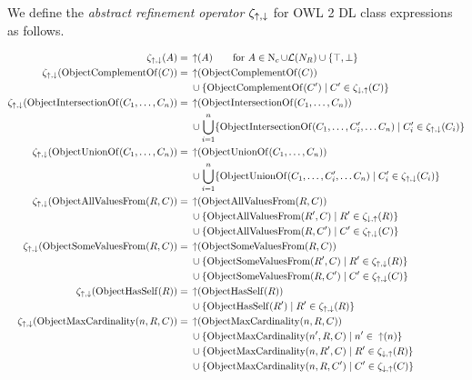 \begin{definition}
  We define the \emph{abstract refinement operator} $\zeta_{\operatorname{\uparrow},\operatorname{\downarrow}}$ for OWL 2 DL class expressions as follows.
  \begin{widepage}
    \scriptsize
    \begin{align*}
     \zeta_{\refine, \corefine}(A) ={} & \refine (A) \qquad \text{for } A \in \op{N}_c \cup \Lmc(N_R) \cup \{ \top , \bot \} \\
     \zeta_{\refine, \corefine}(\op{ObjectComplementOf}(C)) ={} & \refine (\op{ObjectComplementOf}(C)) \\& \cup \{ \op{ObjectComplementOf}(C') \mid C' \in \zeta_{\corefine, \refine} (C) \} \\
     \zeta_{\refine, \corefine}(\op{ObjectIntersectionOf}(C_1, \dots, C_n)) ={} & \refine (\op{ObjectIntersectionOf}(C_1, \dots, C_n)) \\& \cup \bigcup_{i=1}^n \{\op{ObjectIntersectionOf}(C_1, \dots, C_i', \dots C_n) \mid C_i' \in \zeta_{\refine, \corefine} (C_i) \} \\
     \zeta_{\refine, \corefine}(\op{ObjectUnionOf}(C_1, \dots, C_n)) ={} & \refine (\op{ObjectUnionOf}(C_1, \dots, C_n)) \\& \cup \bigcup_{i=1}^n \{ \op{ObjectUnionOf}(C_1, \dots, C_i', \dots C_n) \mid C_i' \in \zeta_{\refine, \corefine} (C_i)\} \\
     \zeta_{\refine, \corefine}(\op{ObjectAllValuesFrom}(R, C)) ={} & \refine (\op{ObjectAllValuesFrom}(R, C)) \\& \cup \{\op{ObjectAllValuesFrom}(R', C) \mid R' \in \zeta_{\corefine, \refine} (R)\} \\& \cup \{\op{ObjectAllValuesFrom}(R, C') \mid C' \in \zeta_{\refine, \corefine} (C)\} \\
     \zeta_{\refine, \corefine}(\op{ObjectSomeValuesFrom}(R, C)) ={} & \refine (\op{ObjectSomeValuesFrom}(R, C)) \\& \cup \{\op{ObjectSomeValuesFrom}(R', C) \mid R' \in \zeta_{\refine, \corefine} (R)\} \\& \cup \{\op{ObjectSomeValuesFrom}(R, C') \mid C' \in \zeta_{\refine, \corefine} (C)\} \\
     \zeta_{\refine, \corefine}(\op{ObjectHasSelf}(R)) ={} & \refine (\op{ObjectHasSelf}(R)) \\& \cup \{\op{ObjectHasSelf}(R') \mid R' \in \zeta_{\refine, \corefine}(R)\} \\
     \zeta_{\refine, \corefine}(\op{ObjectMaxCardinality}(n, R, C)) ={} & \refine (\op{ObjectMaxCardinality}(n, R, C)) \\& \cup \{\op{ObjectMaxCardinality}(n', R, C) \mid n' \in \; \refine (n)\} \\& \cup \{\op{ObjectMaxCardinality}(n, R', C) \mid R' \in \zeta_{\corefine, \refine}(R)\} \\& \cup \{\op{ObjectMaxCardinality}(n, R, C') \mid C' \in \zeta_{\corefine, \refine} (C)\} \\

\end{align*}
\end{widepage}
\end{definition}
